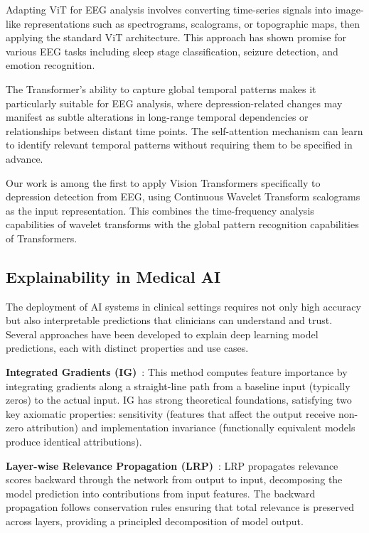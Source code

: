 \documentclass[blue,fullpaper]{ludusofficial}  %
\begin{document}
Adapting ViT for EEG analysis involves converting time-series signals into image-like representations such as spectrograms, scalograms, or topographic maps, then applying the standard ViT architecture. This approach has shown promise for various EEG tasks including sleep stage classification, seizure detection, and emotion recognition.

The Transformer's ability to capture global temporal patterns makes it particularly suitable for EEG analysis, where depression-related changes may manifest as subtle alterations in long-range temporal dependencies or relationships between distant time points. The self-attention mechanism can learn to identify relevant temporal patterns without requiring them to be specified in advance.

Our work is among the first to apply Vision Transformers specifically to depression detection from EEG, using Continuous Wavelet Transform scalograms as the input representation. This combines the time-frequency analysis capabilities of wavelet transforms with the global pattern recognition capabilities of Transformers.

\subsection{Explainability in Medical AI}

The deployment of AI systems in clinical settings requires not only high accuracy but also interpretable predictions that clinicians can understand and trust. Several approaches have been developed to explain deep learning model predictions, each with distinct properties and use cases.

\textbf{Integrated Gradients (IG)}~\cite{sundararajan2017axiomatic}: This method computes feature importance by integrating gradients along a straight-line path from a baseline input (typically zeros) to the actual input. IG has strong theoretical foundations, satisfying two key axiomatic properties: sensitivity (features that affect the output receive non-zero attribution) and implementation invariance (functionally equivalent models produce identical attributions).

\textbf{Layer-wise Relevance Propagation (LRP)}~\cite{bach2015pixel}: LRP propagates relevance scores backward through the network from output to input, decomposing the model prediction into contributions from input features. The backward propagation follows conservation rules ensuring that total relevance is preserved across layers, providing a principled decomposition of model output.
\end{document}
